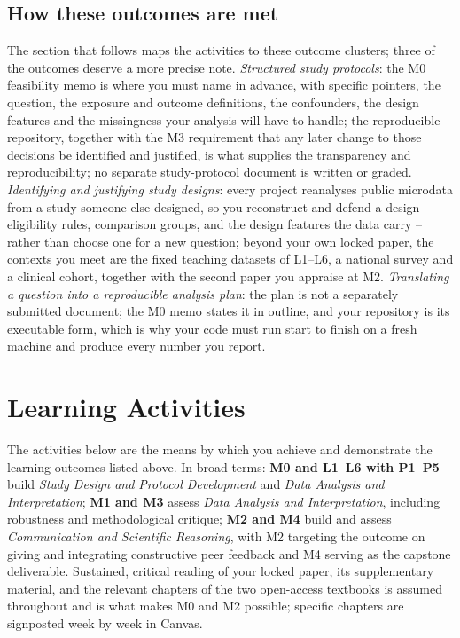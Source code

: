 \documentclass[
]{article}
\begin{document}
\subsection{How these outcomes are
met}\label{how-these-outcomes-are-met}

The section that follows maps the activities to these outcome clusters;
three of the outcomes deserve a more precise note. \emph{Structured
study protocols}: the M0 feasibility memo is where you must name in
advance, with specific pointers, the question, the exposure and outcome
definitions, the confounders, the design features and the missingness
your analysis will have to handle; the reproducible repository, together
with the M3 requirement that any later change to those decisions be
identified and justified, is what supplies the transparency and
reproducibility; no separate study-protocol document is written or
graded. \emph{Identifying and justifying study designs}: every project
reanalyses public microdata from a study someone else designed, so you
reconstruct and defend a design -- eligibility rules, comparison groups,
and the design features the data carry -- rather than choose one for a
new question; beyond your own locked paper, the contexts you meet are
the fixed teaching datasets of L1--L6, a national survey and a clinical
cohort, together with the second paper you appraise at M2.
\emph{Translating a question into a reproducible analysis plan}: the
plan is not a separately submitted document; the M0 memo states it in
outline, and your repository is its executable form, which is why your
code must run start to finish on a fresh machine and produce every
number you report.

\section{Learning Activities}\label{learning-activities}

The activities below are the means by which you achieve and demonstrate
the learning outcomes listed above. In broad terms: \textbf{M0 and
L1--L6 with P1--P5} build \emph{Study Design and Protocol Development}
and \emph{Data Analysis and Interpretation}; \textbf{M1 and M3} assess
\emph{Data Analysis and Interpretation}, including robustness and
methodological critique; \textbf{M2 and M4} build and assess
\emph{Communication and Scientific Reasoning}, with M2 targeting the
outcome on giving and integrating constructive peer feedback and M4
serving as the capstone deliverable. Sustained, critical reading of your
locked paper, its supplementary material, and the relevant chapters of
the two open-access textbooks is assumed throughout and is what makes M0
and M2 possible; specific chapters are signposted week by week in
Canvas.
\end{document}
